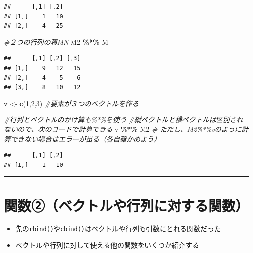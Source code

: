 \documentclass[
]{book}
\newenvironment{Shaded}{\begin{snugshade}}{\end{snugshade}}
\newcommand{\CommentTok}[1]{\textcolor[rgb]{0.56,0.35,0.01}{\textit{#1}}}
\newcommand{\DecValTok}[1]{\textcolor[rgb]{0.00,0.00,0.81}{#1}}
\newcommand{\FunctionTok}[1]{\textcolor[rgb]{0.13,0.29,0.53}{\textbf{#1}}}
\newcommand{\NormalTok}[1]{#1}
\newcommand{\OtherTok}[1]{\textcolor[rgb]{0.56,0.35,0.01}{#1}}
\newcommand{\SpecialCharTok}[1]{\textcolor[rgb]{0.81,0.36,0.00}{\textbf{#1}}}
\providecommand{\tightlist}{%
  \setlength{\itemsep}{0pt}\setlength{\parskip}{0pt}}
\begin{document}
\begin{verbatim}
##      [,1] [,2]
## [1,]    1   10
## [2,]    4   25
\end{verbatim}

\begin{Shaded}
\begin{Highlighting}[]
\CommentTok{\#２つの行列の積MN}
\NormalTok{M2 }\SpecialCharTok{\%*\%}\NormalTok{ M　}
\end{Highlighting}
\end{Shaded}

\begin{verbatim}
##      [,1] [,2] [,3]
## [1,]    9   12   15
## [2,]    4    5    6
## [3,]    8   10   12
\end{verbatim}

\begin{Shaded}
\begin{Highlighting}[]
\NormalTok{v }\OtherTok{\textless{}{-}} \FunctionTok{c}\NormalTok{(}\DecValTok{1}\NormalTok{,}\DecValTok{2}\NormalTok{,}\DecValTok{3}\NormalTok{) }\CommentTok{\#要素が３つのベクトルを作る}

\CommentTok{\#行列とベクトルのかけ算も\%*\%を使う}
\CommentTok{\#縦ベクトルと横ベクトルは区別されないので、次のコードで計算できる}
\NormalTok{v }\SpecialCharTok{\%*\%}\NormalTok{ M2 }\CommentTok{\# ただし、M2\%*\%vのように計算できない場合はエラーが出る（各自確かめよう）}
\end{Highlighting}
\end{Shaded}

\begin{verbatim}
##      [,1] [,2]
## [1,]    1   10
\end{verbatim}

\begin{center}\rule{0.5\linewidth}{0.5pt}\end{center}

\hypertarget{ux95a2ux6570ux2461ux30d9ux30afux30c8ux30ebux3084ux884cux5217ux306bux5bfeux3059ux308bux95a2ux6570}{%
\section{関数②（ベクトルや行列に対する関数）}\label{ux95a2ux6570ux2461ux30d9ux30afux30c8ux30ebux3084ux884cux5217ux306bux5bfeux3059ux308bux95a2ux6570}}

\begin{itemize}
\tightlist
\item
  先の\texttt{rbind()}や\texttt{cbind()}はベクトルや行列も引数にとれる関数だった
\item
  ベクトルや行列に対して使える他の関数をいくつか紹介する
\end{itemize}
\end{document}
